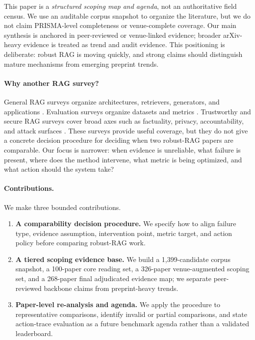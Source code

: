 \documentclass[11pt]{article}
\begin{document}
This paper is a \emph{structured scoping map and agenda}, not an authoritative field census. We use an auditable corpus snapshot to organize the literature, but we do not claim PRISMA-level completeness or venue-complete coverage. Our main synthesis is anchored in peer-reviewed or venue-linked evidence; broader arXiv-heavy evidence is treated as trend and audit evidence. This positioning is deliberate: robust RAG is moving quickly, and strong claims should distinguish mature mechanisms from emerging preprint trends.

\paragraph{Why another RAG survey?}
General RAG surveys organize architectures, retrievers, generators, and applications \citep{ragSurvey2024,ragComprehensive2025}. Evaluation surveys organize datasets and metrics \citep{ragEvaluationSurvey2024}. Trustworthy and secure RAG surveys cover broad axes such as factuality, privacy, accountability, and attack surfaces \citep{trustRAGCompass2024,trustworthyRAGSurvey2025,securityRAGSurvey2026}. These surveys provide useful coverage, but they do not give a concrete decision procedure for deciding when two robust-RAG papers are comparable. Our focus is narrower: when evidence is unreliable, what failure is present, where does the method intervene, what metric is being optimized, and what action should the system take?


\paragraph{Contributions.}
We make three bounded contributions.
\begin{enumerate}[leftmargin=*]
    \item \textbf{A comparability decision procedure.} We specify how to align failure type, evidence assumption, intervention point, metric target, and action policy before comparing robust-RAG work.
    \item \textbf{A tiered scoping evidence base.} We build a 1,399-candidate corpus snapshot, a 100-paper core reading set, a 326-paper venue-augmented scoping set, and a 268-paper final adjudicated evidence map; we separate peer-reviewed backbone claims from preprint-heavy trends.
    \item \textbf{Paper-level re-analysis and agenda.} We apply the procedure to representative comparisons, identify invalid or partial comparisons, and state action-trace evaluation as a future benchmark agenda rather than a validated leaderboard.
\end{enumerate}
\end{document}
